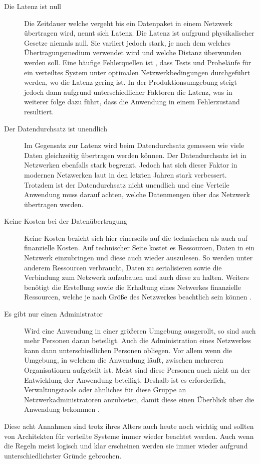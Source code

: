 \begin{description}
    \item[Die Latenz ist null]
    Die Zeitdauer welche vergeht bis ein Datenpaket in einem Netzwerk übertragen wird, nennt sich Latenz. Die Latenz ist aufgrund physikalischer Gesetze niemals null. Sie variiert jedoch stark, je nach dem welches Übertragungsmedium verwendet wird und welche Distanz überwunden werden soll. Eine häufige  Fehlerquellen ist \cite{rotem2006fallacies}, dass Tests und Probeläufe für ein verteiltes System unter optimalen Netzwerkbedingungen durchgeführt werden, wo die Latenz gering ist. In der Produktionsumgebung steigt jedoch dann aufgrund unterschiedlicher Faktoren die Latenz, was in weiterer folge dazu führt, dass die Anwendung in einem Fehlerzustand resultiert. 
    \item[Der Datendurchsatz ist unendlich]
    Im Gegensatz zur Latenz wird beim Datendurchsatz gemessen wie viele Daten gleichzeitig übertragen werden können. Der Datendurchsatz ist in Netzwerken ebenfalls stark begrenzt. Jedoch hat sich dieser Faktor in modernen Netzwerken laut \cite{rotem2006fallacies} in den letzten Jahren stark verbessert. Trotzdem ist der Datendurchsatz nicht unendlich und eine Verteile Anwendung muss darauf achten, welche Datenmengen über das Netzwerk übertragen werden.  
    \item[Keine Kosten bei der Datenübertragung]
    Keine Kosten bezieht sich hier einerseits auf die technischen als auch auf finanzielle Kosten. Auf technischer Seite kostet es Ressourcen, Daten in ein Netzwerk einzubringen und diese auch wieder auszulesen. So werden unter anderem Ressourcen verbraucht, Daten zu serialisieren sowie die Verbindung zum Netzwerk aufzubauen und auch diese zu halten. Weiters benötigt die Erstellung sowie die Erhaltung eines Netwerkes finanzielle Ressourcen, welche je nach Größe des Netzwerkes beachtlich sein können \cite{rotem2006fallacies}.
    \item[Es gibt nur einen Administrator]
    Wird eine Anwendung in einer größeren Umgebung ausgerollt, so sind auch mehr Personen daran beteiligt. Auch die Administration eines Netzwerkes kann dann unterschiedlichen Personen obliegen. Vor allem wenn die Umgebung, in welchem die Anwendung läuft, zwischen mehreren Organisationen aufgeteilt ist. Meist sind diese Personen auch nicht an der Entwicklung der Anwendung beteiligt. Deshalb ist es erforderlich, Verwaltungstools oder ähnliches für diese Gruppe an Netzwerkadministratoren anzubieten, damit diese einen Überblick über die Anwendung bekommen \cite{rotem2006fallacies}.  
\end{description}
Diese acht Annahmen sind trotz ihres Alters auch heute noch wichtig und sollten von Architekten für verteilte Systeme immer wieder beachtet werden. Auch wenn die Regeln meist logisch und klar erscheinen werden sie immer wieder aufgrund unterschiedlichster Gründe gebrochen. \cite{rotem2006fallacies} 

